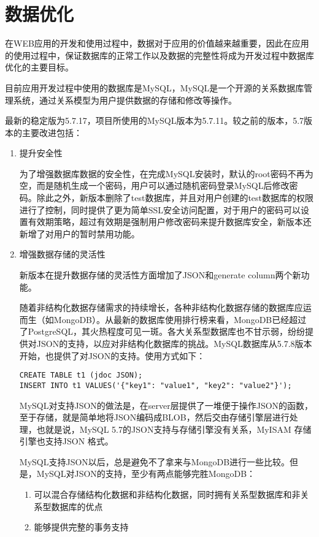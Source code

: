 \chapter{数据优化}
\label{cha:Database}
在WEB应用的开发和使用过程中，数据对于应用的价值越来越重要，因此在应用的使用过程中，保证数据库的正常工作以及数据的完整性将成为开发过程中数据库优化的主要目标。

目前应用开发过程中使用的数据库是MySQL，MySQL是一个开源的关系数据库管理系统，通过关系模型为用户提供数据的存储和修改等操作。

最新的稳定版为5.7.17，项目所使用的MySQL版本为5.7.11。较之前的版本，5.7版本的主要改进包括：
\begin{enumerate}
    \item 提升安全性

    为了增强数据库数据的安全性，在完成MySQL安装时，默认的root密码不再为空，而是随机生成一个密码，用户可以通过随机密码登录MySQL后修改密码。除此之外，新版本删除了test数据库，并且对用户创建的test数据库的权限进行了控制，同时提供了更为简单SSL安全访问配置，对于用户的密码可以设置有效期策略，超过有效期是强制用户修改密码来提升数据库安全，新版本还新增了对用户的暂时禁用功能。
    \item 增强数据存储的灵活性

    新版本在提升数据存储的灵活性方面增加了JSON和generate column两个新功能。

    随着非结构化数据存储需求的持续增长，各种非结构化数据存储的数据库应运而生（如MongoDB）。从最新的数据库使用排行榜来看，MongoDB已经超过了PostgreSQL，其火热程度可见一斑。各大关系型数据库也不甘示弱，纷纷提供对JSON的支持，以应对非结构化数据库的挑战。MySQL数据库从5.7.8版本开始，也提供了对JSON的支持。使用方式如下：
\begin{lstlisting}[numbers=none]
CREATE TABLE t1 (jdoc JSON);
INSERT INTO t1 VALUES('{"key1": "value1", "key2": "value2"}');
\end{lstlisting}
MySQL对支持JSON的做法是，在server层提供了一堆便于操作JSON的函数，至于存储，就是简单地将JSON编码成BLOB，然后交由存储引擎层进行处理，也就是说，MySQL 5.7的JSON支持与存储引擎没有关系，MyISAM 存储引擎也支持JSON 格式。

MySQL支持JSON以后，总是避免不了拿来与MongoDB进行一些比较。但是，MySQL对JSON的支持，至少有两点能够完胜MongoDB：
\begin{enumerate}
\item 可以混合存储结构化数据和非结构化数据，同时拥有关系型数据库和非关系型数据库的优点
\item 能够提供完整的事务支持
\end{enumerate}


\end{enumerate}
